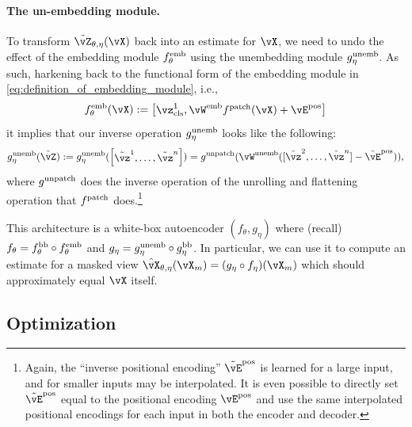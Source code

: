 \documentclass[../../book-main.tex]{subfiles}
\begin{document}
\paragraph{The un-embedding module.} To transform \(\tilde{\vZ}_{\theta, \eta}(\vX)\) back into an estimate for \(\vX\), we need to undo the effect of the embedding module \(f_{\theta}^{\mathrm{emb}}\) using the unembedding module \(g_{\eta}^{\mathrm{unemb}}\). As such, harkening back to the functional form of the embedding module in \eqref{eq:definition_of_embedding_module}, i.e.,
\begin{equation}
    f_{\theta}^{\emb}(\vX) := \mat{\vz_{\cls}^{1}, \vW^{\emb}f^{\patch}(\vX) + \vE^{\pos}}
\end{equation}
it implies that our inverse operation \(g_{\eta}^{\mathrm{unemb}}\) looks like the following:
\begin{equation}
    g_{\eta}^{\unemb}(\tilde{\vZ}) := g_{\eta}^{\unemb}(\mat{\tilde{\vz}^{1}, \dots, \tilde{\vz}^{n}}) = g^{\unpatch}(\vW^{\unemb}([\tilde{\vz}^{2}, \dots, \tilde{\vz}^{n}] - \tilde{\vE}^{\pos})),
\end{equation}
where \(g^{\mathrm{unpatch}}\) does the inverse operation of the unrolling and flattening operation that \(f^{\mathrm{patch}}\) does.\footnote{Again, the ``inverse positional encoding'' \(\tilde{\vE}^{\pos}\) is learned for a large input, and for smaller inputs may be interpolated. It is even possible to directly set \(\tilde{\vE}^{\pos}\) equal to the positional encoding \(\vE^{\pos}\) and use the same interpolated positional encodings for each input in both the encoder and decoder.}

This architecture is a white-box autoencoder \((f_{\theta}, g_{\eta})\) where (recall) \(f_{\theta} = f_{\theta}^{\mathrm{bb}} \circ f_{\theta}^{\mathrm{emb}}\) and \(g_{\eta} = g_{\eta}^{\mathrm{unemb}} \circ g_{\eta}^{\mathrm{bb}}\). In particular, we can use it to compute an estimate for a masked view \(\hat{\vX}_{\theta, \eta}(\vX_{m}) = (g_{\eta} \circ f_{\eta})(\vX_{m})\) which should approximately equal \(\vX\) itself.

\subsection{Optimization}\label{sub:image_completion_optimization}
\end{document}
